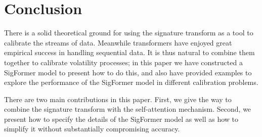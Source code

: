 \documentclass[]{article}
\renewcommand{\(}{\left(}
\renewcommand{\)}{\right)}
\begin{document}
	\section{Conclusion}
	\label{sec-conclusion}
	There is a solid theoretical ground for using the signature transform as a tool to calibrate the streams of data. Meanwhile transformers have enjoyed great empirical success in handling sequential data. It is thus natural to combine them together to calibrate volatility processes; in this paper we have constructed a SigFormer model to present how to do this, and also have provided examples to explore the performance of the SigFormer model in different calibration problems.
	
	There are two main contributions in this paper. First, we give the way to combine the signature transform with the self-attention mechanism. Second, we present how to specify the details of the SigFormer model as well as how to simplify it without substantially compromising accuracy.
	
\end{document}
